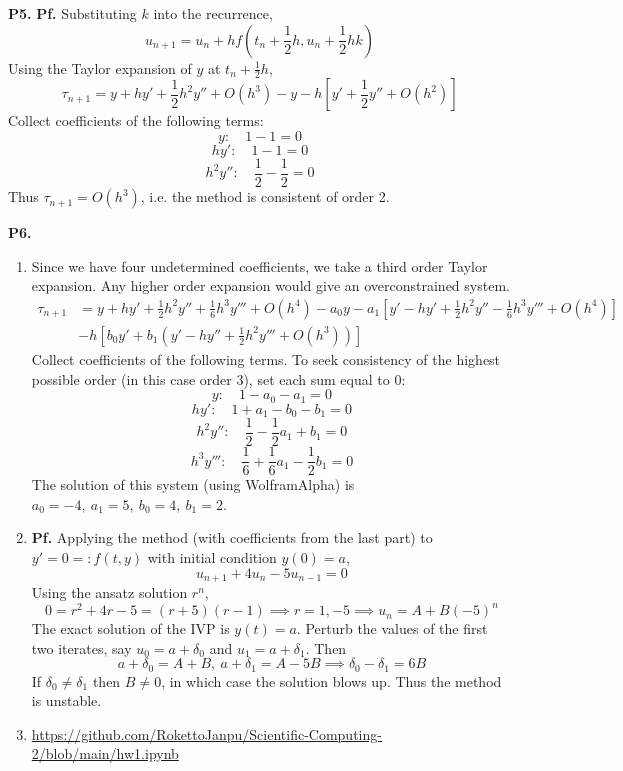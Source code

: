 \documentclass{article}
\def\tbf#1{\textbf{#1}}
\newcommand{\br}[1]{\left(#1\right)}
\newcommand{\sbr}[1]{\left[#1\right]}
\newcommand{\pf}{\tbf{Pf. }}
\newcommand{\imp}{\implies}
\newcommand{\sep}[1][.5cm]{\vspace{#1}}
\begin{document}
\tbf{P5.} \pf Substituting $k$ into the recurrence,
$$u_{n+1} = u_n + hf\br{t_n+\frac12h,u_n+\frac12hk}$$
Using the Taylor expansion of $y$ at $t_n+\frac12h$,
$$\tau_{n+1} = y + hy' + \frac12h^2y'' + O(h^3) - y - h\sbr{y' + \frac12y'' + O(h^2)}$$
Collect coefficients of the following terms:
$$y: \quad 1 - 1 = 0$$
$$hy': \quad 1 - 1 = 0$$
$$h^2y'': \quad \frac12 - \frac12 = 0$$
Thus $\tau_{n+1}=O(h^3)$, i.e. the method is consistent of order 2.
\sep



\tbf{P6.}

\begin{enumerate}[label=(\alph*)]
	
\item Since we have four undetermined coefficients, we take a third order Taylor expansion. Any higher order expansion would give an overconstrained system.
\begin{align*}
	\tau_{n+1} &= y + hy' + \frac12h^2y'' + \frac16h^3y''' + O(h^4) - a_0y - a_1\sbr{y' - hy' + \frac12h^2y'' - \frac16h^3y''' + O(h^4)}\\
	& - h\sbr{b_0y' + b_1\br{y' - hy'' + \frac12h^2y''' + O(h^3)}}
\end{align*}
Collect coefficients of the following terms. To seek consistency of the highest possible order (in this case order 3), set each sum equal to 0:
$$y: \quad 1 - a_0 - a_1 = 0$$
$$hy': \quad 1 + a_1 - b_0 - b_1 = 0$$
$$h^2y'': \quad \frac12 - \frac12a_1 + b_1 = 0$$
$$h^3y''': \quad \frac16+ \frac16a_1 - \frac12b_1 = 0$$
The solution of this system (using WolframAlpha) is $a_0=-4,~a_1=5,~b_0=4,~b_1=2$.


\item \pf Applying the method (with coefficients from the last part) to $y'=0=:f(t,y)$ with initial condition $y(0)=a$,
$$u_{n+1} + 4u_n - 5u_{n-1} = 0$$
Using the ansatz solution $r^n$,
$$0 = r^2+4r-5 = (r+5)(r-1)
\imp r=1,-5
\imp u_n = A + B(-5)^n$$
The exact solution of the IVP is $y(t)=a$. Perturb the values of the first two iterates, say $u_0=a+\delta_0$ and $u_1=a+\delta_1$. Then
$$a+\delta_0 = A+B,~a+\delta_1 = A-5B
\imp \delta_0 - \delta_1 = 6B$$
If $\delta_0\ne\delta_1$ then $B\ne0$, in which case the solution blows up. Thus the method is unstable.


\item \url{https://github.com/RokettoJanpu/Scientific-Computing-2/blob/main/hw1.ipynb}

\end{enumerate}
\end{document}
